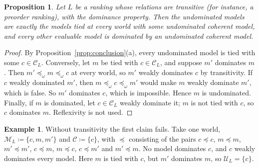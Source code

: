\documentclass[11pt]{article}
\newtheorem{proposition}[theorem]{Proposition}
\theoremstyle{definition}
\newtheorem{example}[theorem]{Example}
\theoremstyle{remark}
\newcommand{\M}{\mathcal M}
\newcommand{\C}{\mathcal C}
\newcommand{\U}{\mathcal U}
\begin{document}
\begin{proposition}\label{prop:profiles}
Let $L$ be a ranking whose relations are transitive (for instance, a preorder ranking), with the dominance property. Then the undominated models are exactly the models tied at every world with some undominated coherent model, and every other evaluable model is dominated by an undominated coherent model.
\end{proposition}
\begin{proof}
By Proposition~\ref{prop:conclusion}(a), every undominated model is tied with some $c\in\C_L$. Conversely, let $m$ be tied with $c\in\C_L$, and suppose $m'$ dominates $m$. Then $m'\preceq_\omega m\preceq_\omega c$ at every world, so $m'$ weakly dominates $c$ by transitivity. If $c$ weakly dominated $m'$, then $m\preceq_\omega c\preceq_\omega m'$ would make $m$ weakly dominate $m'$, which is false. So $m'$ dominates $c$, which is impossible. Hence $m$ is undominated. Finally, if $m$ is dominated, let $c\in\C_L$ weakly dominate it; $m$ is not tied with $c$, so $c$ dominates $m$. Reflexivity is not used.
\end{proof}

\begin{example}\label{ex:intransitive}
Without transitivity the first claim fails. Take one world, $\M_L\coloneqq\{c,m,m'\}$ and $\C\coloneqq\{c\}$, with $\preceq$ consisting of the pairs $c\preceq c$, $m\preceq m$, $m'\preceq m'$, $c\preceq m$, $m\preceq c$, $c\preceq m'$ and $m'\preceq m$. No model dominates $c$, and $c$ weakly dominates every model. Here $m$ is tied with $c$, but $m'$ dominates $m$, so $\U_L=\{c\}$.
\end{example}
\end{document}

